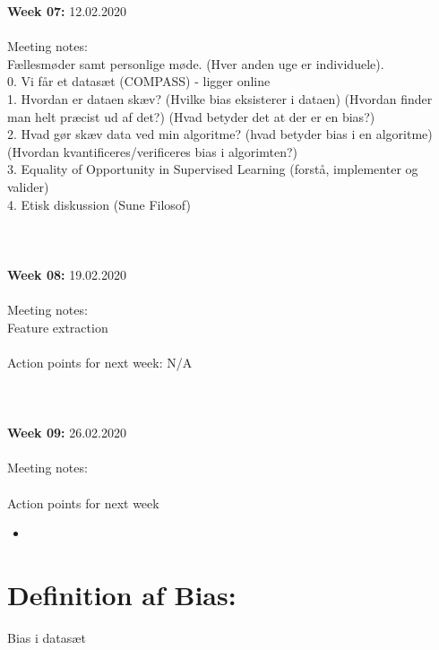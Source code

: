 \documentclass[11pt, fleqn]{article}
\begin{document}
	\textbf{Week 07:}  12.02.2020 \\\\
	\noindent
	Meeting notes: \\ Fællesmøder samt personlige møde. (Hver anden uge er individuele). \\0. Vi får et datasæt (COMPASS) - ligger online \\
	1. Hvordan er dataen skæv? (Hvilke bias eksisterer i dataen) (Hvordan finder man helt præcist ud af det?) (Hvad betyder det at der er en bias?) \\
	2. Hvad gør skæv data ved min algoritme? (hvad betyder bias i en algoritme) (Hvordan kvantificeres/verificeres bias i algorimten?) \\
	3. Equality of Opportunity in Supervised Learning (forstå, implementer og valider) \\ 
	4. Etisk diskussion (Sune Filosof)
	\\\\\\\\
	\textbf{Week 08:}  19.02.2020 \\\\
	\noindent
	Meeting notes: \\ Feature extraction
	\\\\
	Action points for next week: N/A
	\\\\\\\\
	\textbf{Week 09:}  26.02.2020 \\\\
	\noindent
	Meeting notes: 
	\\\\
	Action points for next week
	\begin{itemize}
		\item  
	\end{itemize}

\section*{Definition af Bias:}
	
	Bias i datasæt 
		
	
\end{document}
